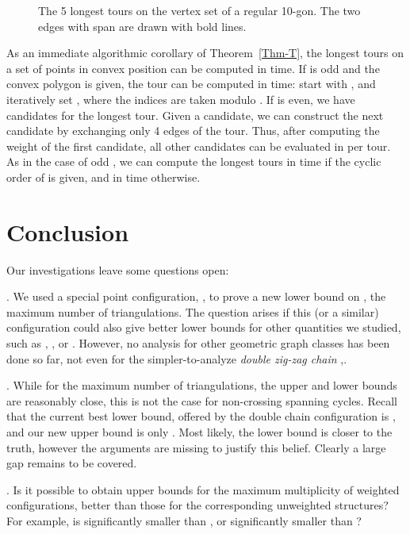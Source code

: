 \documentclass[11pt]{article}
\begin{document}
\begin{figure}[htbp]
\centerline{\epsfysize=1.2in }
\caption{The 5 longest tours on the vertex set of a regular
  10-gon. The two edges with span  are drawn with bold lines.}
\label{fig:longtour10}
\end{figure}

As an immediate algorithmic corollary of
Theorem~\ref{Thm-T}, the longest tours on a set of 
points in convex position can be computed in  time. 
If  is odd and the convex polygon  is given, 
the tour can be computed in  time: start with ,
and iteratively set , where the indices
are taken modulo .
If  is even, we have  candidates for the longest tour. 
Given a candidate, we can construct the next candidate by exchanging
only 4 edges of the tour. Thus, after computing the weight of the first candidate,
all other candidates can be evaluated in  per tour.
As in the case of odd , we can compute the longest tours in
 time if the cyclic order of  is given, and in  time otherwise.




\section{Conclusion} \label{sec:conclusion}

Our investigations leave some questions open:

. We used a special point configuration, , to prove a new lower
bound on , the maximum number of triangulations. The question arises if
this (or a similar) configuration could also give better lower bounds for other
quantities we studied, such as , , or .
However, no analysis for other geometric graph classes has been done
so far, not even for the simpler-to-analyze \emph{double zig-zag chain} ,.

. While for the maximum number of triangulations, the upper and lower
bounds are reasonably close, this is not the case for non-crossing
spanning cycles. Recall that the current best lower bound, offered
by the double chain configuration is , and our new upper bound
is only . Most likely, the lower bound is closer to the
truth, however the arguments are missing to justify this belief.
Clearly a large gap remains to be covered.

. Is it possible to obtain upper bounds for the maximum
multiplicity of weighted configurations, better than those for the
corresponding unweighted structures? For example, is 
significantly smaller than , or 
significantly smaller than ?
\end{document}
